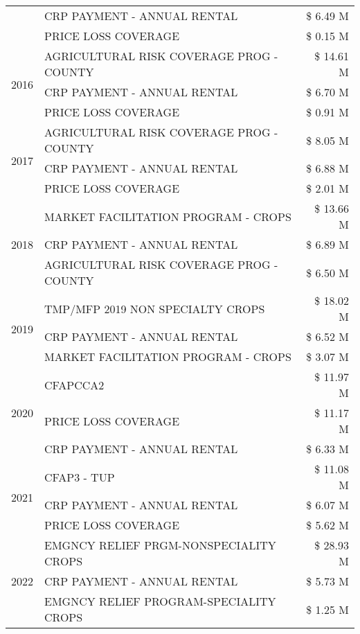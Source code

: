 \begin{tabular}{llr}
 & CRP PAYMENT - ANNUAL RENTAL & \$ 6.49 M \\
 & PRICE LOSS COVERAGE & \$ 0.15 M \\
\cline{1-3}
\multirow[t]{3}{*}{2016} & AGRICULTURAL RISK COVERAGE PROG - COUNTY & \$ 14.61 M \\
 & CRP PAYMENT - ANNUAL RENTAL & \$ 6.70 M \\
 & PRICE LOSS COVERAGE & \$ 0.91 M \\
\cline{1-3}
\multirow[t]{3}{*}{2017} & AGRICULTURAL RISK COVERAGE PROG - COUNTY & \$ 8.05 M \\
 & CRP PAYMENT - ANNUAL RENTAL & \$ 6.88 M \\
 & PRICE LOSS COVERAGE & \$ 2.01 M \\
\cline{1-3}
\multirow[t]{3}{*}{2018} & MARKET FACILITATION PROGRAM - CROPS & \$ 13.66 M \\
 & CRP PAYMENT - ANNUAL RENTAL & \$ 6.89 M \\
 & AGRICULTURAL RISK COVERAGE PROG - COUNTY & \$ 6.50 M \\
\cline{1-3}
\multirow[t]{3}{*}{2019} & TMP/MFP 2019 NON SPECIALTY CROPS & \$ 18.02 M \\
 & CRP PAYMENT - ANNUAL RENTAL & \$ 6.52 M \\
 & MARKET FACILITATION PROGRAM - CROPS & \$ 3.07 M \\
\cline{1-3}
\multirow[t]{3}{*}{2020} & CFAPCCA2 & \$ 11.97 M \\
 & PRICE LOSS COVERAGE & \$ 11.17 M \\
 & CRP PAYMENT - ANNUAL RENTAL & \$ 6.33 M \\
\cline{1-3}
\multirow[t]{3}{*}{2021} & CFAP3 - TUP & \$ 11.08 M \\
 & CRP PAYMENT - ANNUAL RENTAL & \$ 6.07 M \\
 & PRICE LOSS COVERAGE & \$ 5.62 M \\
\cline{1-3}
\multirow[t]{3}{*}{2022} & EMGNCY RELIEF PRGM-NONSPECIALITY CROPS & \$ 28.93 M \\
 & CRP PAYMENT - ANNUAL RENTAL & \$ 5.73 M \\
 & EMGNCY RELIEF PROGRAM-SPECIALITY CROPS & \$ 1.25 M \\
\cline{1-3}
\bottomrule
\end{tabular}
